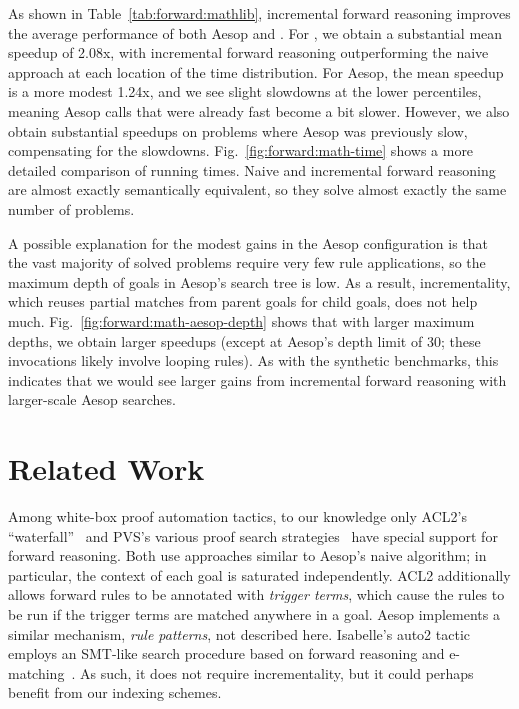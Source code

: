 As shown in Table~\ref{tab:forward:mathlib}, incremental forward reasoning improves the average performance of both Aesop and .
For , we obtain a substantial mean speedup of 2.08x, with incremental forward reasoning outperforming the naive approach at each location of the time distribution.
For Aesop, the mean speedup is a more modest 1.24x, and we see slight slowdowns at the lower percentiles, meaning Aesop calls that were already fast become a bit slower.
However, we also obtain substantial speedups on problems where Aesop was previously slow, compensating for the slowdowns.
Fig.~\ref{fig:forward:math-time} shows a more detailed comparison of running times.
Naive and incremental forward reasoning are almost exactly semantically equivalent, so they solve almost exactly the same number of problems.

A possible explanation for the modest gains in the Aesop configuration is that the vast majority of solved problems require very few rule applications, so the maximum depth of goals in Aesop's search tree is low.
As a result, incrementality, which reuses partial matches from parent goals for child goals, does not help much.
Fig.~\ref{fig:forward:math-aesop-depth} shows that with larger maximum depths, we obtain larger speedups (except at Aesop's depth limit of 30; these invocations likely involve looping rules).
As with the synthetic benchmarks, this indicates that we would see larger gains from incremental forward reasoning with larger-scale Aesop searches.

\section{Related Work}

Among white-box proof automation tactics, to our knowledge only ACL2's \enquote{waterfall}~\cite{ACL2Book} and PVS's various proof search strategies~\cite{PVS-tutorial} have special support for forward reasoning.
Both use approaches similar to Aesop's naive algorithm; in particular, the context of each goal is saturated independently.
ACL2 additionally allows forward rules to be annotated with \emph{trigger terms}, which cause the rules to be run if the trigger terms are matched anywhere in a goal.
Aesop implements a similar mechanism, \emph{rule patterns}, not described here.
Isabelle's auto2 tactic~\cite{auto2} employs an SMT-like search procedure based on forward reasoning and e-matching~\cite{simplify}.
As such, it does not require incrementality, but it could perhaps benefit from our indexing schemes.

